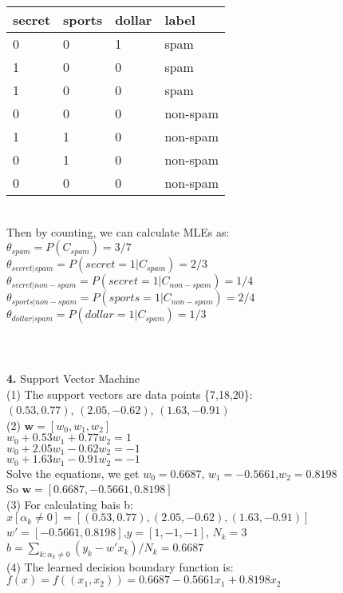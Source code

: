 \documentclass[11pt,a4paper,fleqn]{article}
\begin{document}
\begin{tabular}{|l|l|l|l|}
\hline
secret&sports&dollar&label\\
\hline
0&0&1&spam\\
1&0&0&spam\\
1&0&0&spam\\
0&0&0&non-spam\\
1&1&0&non-spam\\
0&1&0&non-spam\\
0&0&0&non-spam\\
\hline
\end{tabular}\\
Then by counting, we can calculate MLEs as:\\
$\theta_{spam} = P(C_{spam}) = 3/7$\\
$\theta_{secret|spam}  = P(secret=1|C_{spam}) = 2/3$\\
$\theta_{secret|non-spam} = P(secret=1|C_{non-spam}) = 1/4$\\
$\theta_{sports|non-spam} = P(sports=1|C_{non-spam}) = 2/4$\\
$\theta_{dollar|spam} = P(dollar=1|C_{spam}) = 1/3$\\
\\ \\ \\
\textbf{4.} Support Vector Machine\\
(1) The support vectors are data points \{7,18,20\}: \\
\indent $(0.53,0.77)$, $(2.05,-0.62)$, $(1.63,-0.91)$\\
(2) $\mathbf{w} = [w_0,w_1,w_2]$\\
\indent $w_0+0.53w_1+0.77w_2=1$\\
\indent $w_0+2.05w_1-0.62w_2=-1$\\
\indent $w_0+1.63w_1-0.91w_2=-1$\\
\indent Solve the equations, we get $w_0=0.6687$, $w_1=-0.5661$,$w_2=0.8198$\\
\indent So $\mathbf{w}=[0.6687,-0.5661,0.8198]$\\
(3) For calculating bais b:\\
\indent $x[\alpha_k\ne0]=[(0.53,0.77), (2.05,-0.62), (1.63,-0.91)]$\\
\indent $w' = [-0.5661, 0.8198]$,$y = [1,-1,-1]$, $N_k=3$\\
\indent $b=\sum_{k:\alpha_k\ne0}(y_k-w'x_k)/N_k=0.6687$\\
(4) The learned decision boundary function is:\\
\indent $f(x)=f((x_1,x_2))=0.6687-0.5661x_1+0.8198x_2$\\
\end{document}
